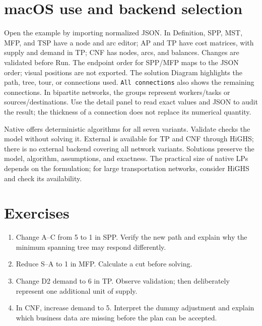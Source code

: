 \section{macOS use and backend selection}
Open the example by importing normalized JSON. In Definition,
SPP, MST, MFP, and TSP have a node and arc editor;
AP and TP have cost matrices, with supply and demand in TP; CNF has nodes,
arcs, and balances. Changes are validated before Run. The endpoint order
for SPP/MFP maps to the JSON order; visual positions are not exported.
The solution Diagram highlights the path, tree, tour, or connections used.
\texttt{All connections} also shows the remaining connections. In bipartite
networks, the groups represent workers/tasks or sources/destinations.
Use the detail panel to read exact values and JSON to audit the result;
the thickness of a connection does not replace its numerical quantity.

Native offers deterministic algorithms for all seven variants. Validate
checks the model without solving it. External is available for TP and CNF
through HiGHS; there is no external backend covering all network variants.
Solutions preserve the model, algorithm, assumptions, and exactness. The
practical size of native LPs depends on the formulation; for large
transportation networks, consider HiGHS and check its availability.

\section{Exercises}
\begin{enumerate}
\item Change A--C from 5 to 1 in SPP. Verify the new path and explain why
      the minimum spanning tree may respond differently.
\item Reduce S--A to 1 in MFP. Calculate a cut before solving.
\item Change D2 demand to 6 in TP. Observe validation; then
      deliberately represent one additional unit of supply.
\item In CNF, increase demand to 5. Interpret the dummy adjustment and
      explain which business data are missing before the plan can be accepted.
\end{enumerate}
